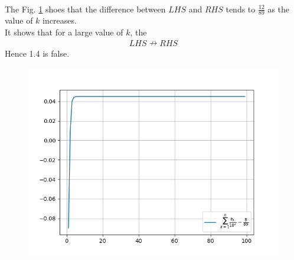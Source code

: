 \documentclass[journal,12pt,twocolumn]{IEEEtran}
\renewcommand\thesection{\arabic{section}}
\begin{document}
\begin{enumerate}[label=\thesection.\arabic*,ref=\thesection.\theenumi]
	\solution\\ 
		The Fig. \ref{fig:1.4} shoes that the difference between $LHS$ and $RHS$ tends to $\frac{12}{89}$ as the value of $k$ increases.\\
		It shows that for a large value of $k$, the
		\begin{align*}
			LHS \nrightarrow RHS	
		\end{align*}
		Hence 1.4 is false.
	
		\begin{figure}[ht]
			\begin{center}
				\includegraphics[width=0.7\columnwidth]{figs/1_4}
			\end{center}
			\label{fig:1.4}    
		\end{figure}
\end{enumerate}
\end{document}
